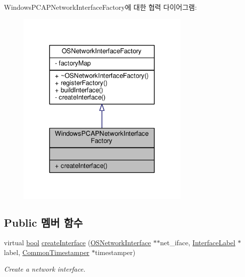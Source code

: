 Windows\+P\+C\+A\+P\+Network\+Interface\+Factory에 대한 협력 다이어그램\+:
\nopagebreak
\begin{figure}[H]
\begin{center}
\leavevmode
\includegraphics[width=240pt]{class_windows_p_c_a_p_network_interface_factory__coll__graph}
\end{center}
\end{figure}
\subsection*{Public 멤버 함수}
\begin{DoxyCompactItemize}
\item 
virtual \hyperlink{avb__gptp_8h_af6a258d8f3ee5206d682d799316314b1}{bool} \hyperlink{class_windows_p_c_a_p_network_interface_factory_ac379b70d42671dcd31ad558226699347}{create\+Interface} (\hyperlink{class_o_s_network_interface}{O\+S\+Network\+Interface} $\ast$$\ast$net\+\_\+iface, \hyperlink{class_interface_label}{Interface\+Label} $\ast$label, \hyperlink{class_common_timestamper}{Common\+Timestamper} $\ast$timestamper)
\begin{DoxyCompactList}\small\item\em Create a network interface. \end{DoxyCompactList}\end{DoxyCompactItemize}
